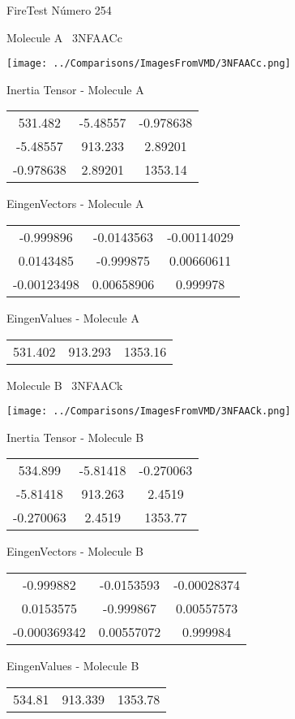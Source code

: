 \vtab[-3cm]
\begin{center}
{\large FireTest \tab Número 254}
\end{center}
\begin{multicols}{2}
\begin{center}

Molecule A \
3NFAACc

\texttt{[image: ../Comparisons/ImagesFromVMD/3NFAACc.png]}

Inertia Tensor - Molecule A \\
\begin{tabular}{|c c c|}
531.482	 & 	-5.48557	 & 	-0.978638	 \\
-5.48557	 & 	913.233	 & 	2.89201	 \\
-0.978638	 & 	2.89201	 & 	1353.14
\end{tabular}

\vtab
 EingenVectors - Molecule A     \\
\begin{tabular}{|c c c|}
-0.999896	 & 	-0.0143563	 & 	-0.00114029	 \\
0.0143485	 & 	-0.999875	 & 	0.00660611	 \\
-0.00123498	 & 	0.00658906	 & 	0.999978
\end{tabular}

\vtab
 EingenValues - Molecule A     \\
\begin{tabular}{|c c c|}
531.402	 & 	913.293	 & 	1353.16	 \\
\end{tabular}
\columnbreak

Molecule B \
3NFAACk

\texttt{[image: ../Comparisons/ImagesFromVMD/3NFAACk.png]}

Inertia Tensor - Molecule B \\
\begin{tabular}{|c c c|}
534.899	 & 	-5.81418	 & 	-0.270063	 \\
-5.81418	 & 	913.263	 & 	2.4519	 \\
-0.270063	 & 	2.4519	 & 	1353.77
\end{tabular}

\vtab
 EingenVectors - Molecule B     \\
\begin{tabular}{|c c c|}
-0.999882	 & 	-0.0153593	 & 	-0.00028374	 \\
0.0153575	 & 	-0.999867	 & 	0.00557573	 \\
-0.000369342	 & 	0.00557072	 & 	0.999984
\end{tabular}

\vtab
 EingenValues - Molecule B     \\
\begin{tabular}{|c c c|}
534.81	 & 	913.339	 & 	1353.78	 \\
\end{tabular}

\end{center}
\end{multicols}

